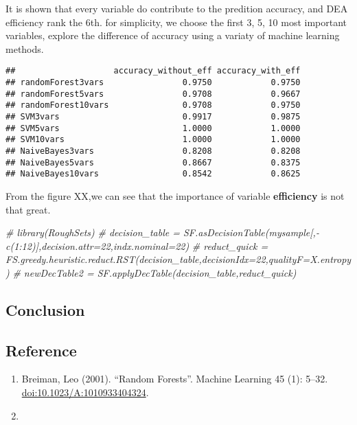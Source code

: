 \documentclass[]{article}
\newenvironment{Shaded}{\begin{snugshade}}{\end{snugshade}}
\newcommand{\CommentTok}[1]{\textcolor[rgb]{0.56,0.35,0.01}{\textit{{#1}}}}
\begin{document}
It is shown that every variable do contribute to the predition accuracy,
and DEA efficiency rank the 6th. for simplicity, we choose the first 3,
5, 10 most important variables, explore the difference of accuracy using
a variaty of machine learning methods.

\begin{verbatim}
##                    accuracy_without_eff accuracy_with_eff
## randomForest3vars                0.9750            0.9750
## randomForest5vars                0.9708            0.9667
## randomForest10vars               0.9708            0.9750
## SVM3vars                         0.9917            0.9875
## SVM5vars                         1.0000            1.0000
## SVM10vars                        1.0000            1.0000
## NaiveBayes3vars                  0.8208            0.8208
## NaiveBayes5vars                  0.8667            0.8375
## NaiveBayes10vars                 0.8542            0.8625
\end{verbatim}

\begin{Shaded}
\end{Shaded}

From the figure XX,we can see that the importance of variable
\textbf{efficiency} is not that great.

\begin{Shaded}
\begin{Highlighting}[]
\CommentTok{# library(RoughSets)}
\CommentTok{# decision_table = SF.asDecisionTable(mysample[,-c(1:12)],decision.attr=22,indx.nominal=22)}
\CommentTok{# reduct_quick = FS.greedy.heuristic.reduct.RST(decision_table,decisionIdx=22,qualityF=X.entropy)}
\CommentTok{# newDecTable2 = SF.applyDecTable(decision_table,reduct_quick)}
\end{Highlighting}
\end{Shaded}

\subsection{Conclusion}\label{conclusion}

\subsection{Reference}\label{reference}

\begin{enumerate}
\def\labelenumi{\arabic{enumi}.}
\item
  Breiman, Leo (2001). ``Random Forests''. Machine Learning 45 (1):
  5--32. \url{doi:10.1023/A:1010933404324}.
\item
\end{enumerate}
\end{document}
